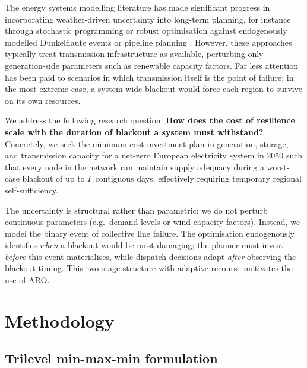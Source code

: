 \documentclass[11pt, a4paper]{article}
\begin{document}
The energy systems modelling literature has made significant progress in incorporating weather-driven uncertainty into long-term planning, for instance through stochastic programming or robust optimisation against endogenously modelled Dunkelflaute events \cite{berneckerAdaptiveRobustOptimization2025} or pipeline planning \cite{riepinAdaptiveRobustOptimization2022}. However, these approaches typically treat transmission infrastructure as available, perturbing only generation-side parameters such as renewable capacity factors. Far less attention has been paid to scenarios in which transmission itself is the point of failure; in the most extreme case, a system-wide blackout would force each region to survive on its own resources.

We address the following research question: \textbf{How does the cost of resilience scale with the duration of blackout a system must withstand?} Concretely, we seek the minimum-cost investment plan in generation, storage, and transmission capacity for a net-zero European electricity system in 2050 such that every node in the network can maintain supply adequacy during a worst-case blackout of up to $\Gamma$ contiguous days, effectively requiring temporary regional self-sufficiency.

The uncertainty is structural rather than parametric: we do not perturb continuous parameters (e.g.\ demand levels or wind capacity factors). Instead, we model the binary event of collective line failure. The optimisation endogenously identifies \emph{when} a blackout would be most damaging; the planner must invest \emph{before} this event materialises, while dispatch decisions adapt \emph{after} observing the blackout timing. This two-stage structure with adaptive recourse motivates the use of ARO.

\section{Methodology}

\subsection{Trilevel min-max-min formulation}
\end{document}
